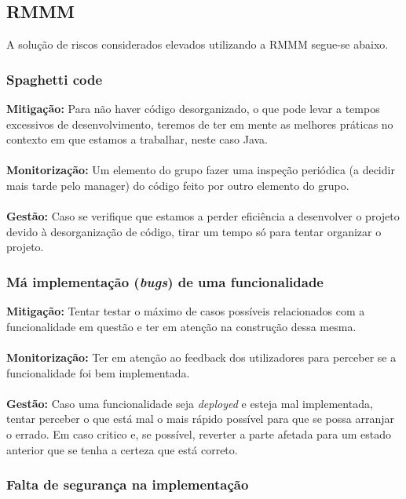 \documentclass[12pt, a4paper, twoside]{report} %
\begin{document}
\subsection{RMMM}

A solução de riscos considerados elevados utilizando a RMMM segue-se abaixo.


\subsubsection{Spaghetti code}

\textbf{Mitigação:} Para não haver código desorganizado, o que pode levar a tempos excessivos de desenvolvimento, teremos de ter em mente as melhores práticas no contexto em que estamos a trabalhar, neste caso Java.\\
\\
\textbf{Monitorização:} Um elemento do grupo fazer uma inspeção periódica (a decidir mais tarde pelo manager) do código feito por outro elemento do grupo.\\
\\
\textbf{Gestão:} Caso se verifique que estamos a perder eficiência a desenvolver o projeto devido à desorganização de código, tirar um tempo só para tentar organizar o projeto.


\subsubsection{Má implementação (\textit{bugs}) de uma funcionalidade}


\textbf{Mitigação:} Tentar testar o máximo de casos possíveis relacionados com a funcionalidade em questão e ter em atenção na construção dessa mesma.\\
\\
\textbf{Monitorização:} Ter em atenção ao feedback dos utilizadores para perceber se a funcionalidade foi bem implementada.\\
\\
\textbf{Gestão:} Caso uma funcionalidade seja \textit{deployed} e esteja mal implementada, tentar perceber o que está mal o mais rápido possível para que se possa arranjar o errado. Em caso critico e, se possível, reverter a parte afetada para um estado anterior que se tenha a certeza que está correto.


\subsubsection{Falta de segurança na implementação}
\end{document}
